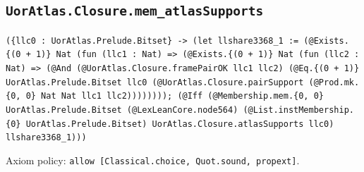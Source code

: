 \documentclass[11pt]{article}
\begin{document}
\subsection*{\texttt{UorAtlas.Closure.mem\_atlasSupports}}
\noindent\texttt{(\{llc0 : UorAtlas.Prelude.Bitset\} -> (let llshare3368\_1 := (@Exists.\{(0 + 1)\} Nat (fun (llc1 : Nat) => (@Exists.\{(0 + 1)\} Nat (fun (llc2 : Nat) => (@And (@UorAtlas.Closure.framePairOK llc1 llc2) (@Eq.\{(0 + 1)\} UorAtlas.Prelude.Bitset llc0 (@UorAtlas.Closure.pairSupport (@Prod.mk.\{0, 0\} Nat Nat llc1 llc2)))))))); (@Iff (@Membership.mem.\{0, 0\} UorAtlas.Prelude.Bitset (@LexLeanCore.node564) (@List.instMembership.\{0\} UorAtlas.Prelude.Bitset) UorAtlas.Closure.atlasSupports llc0) llshare3368\_1)))}\par
\noindent Axiom policy: \texttt{allow [Classical.choice, Quot.sound, propext]}.\par
\end{document}
